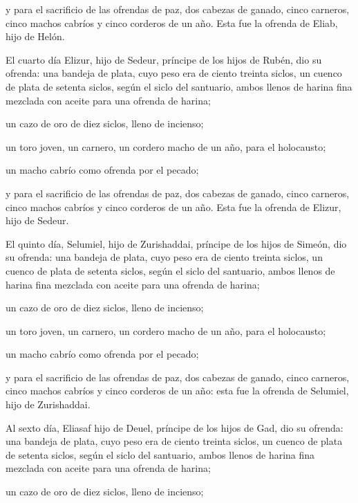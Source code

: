 \begin{paracol}{2}
 y para el sacrificio de las ofrendas de paz, dos cabezas
de ganado, cinco carneros, cinco machos cabríos y cinco corderos de un
año. Esta fue la ofrenda de Eliab, hijo de Helón.

 El cuarto día Elizur, hijo de Sedeur, príncipe de los
hijos de Rubén,  dio su ofrenda: una bandeja de plata,
cuyo peso era de ciento treinta siclos, un cuenco de plata de setenta
siclos, según el siclo del santuario, ambos llenos de harina fina
mezclada con aceite para una ofrenda de harina;

 un cazo de oro de diez siclos, lleno de incienso;

 un toro joven, un carnero, un cordero macho de un año,
para el holocausto;

 un macho cabrío como ofrenda por el pecado;

 y para el sacrificio de las ofrendas de paz, dos cabezas
de ganado, cinco carneros, cinco machos cabríos y cinco corderos de un
año. Esta fue la ofrenda de Elizur, hijo de Sedeur.

 El quinto día, Selumiel, hijo de Zurishaddai, príncipe
de los hijos de Simeón,  dio su ofrenda: una bandeja de
plata, cuyo peso era de ciento treinta siclos, un cuenco de plata de
setenta siclos, según el siclo del santuario, ambos llenos de harina
fina mezclada con aceite para una ofrenda de harina;

 un cazo de oro de diez siclos, lleno de incienso;

 un toro joven, un carnero, un cordero macho de un año,
para el holocausto;

 un macho cabrío como ofrenda por el pecado;

 y para el sacrificio de las ofrendas de paz, dos cabezas
de ganado, cinco carneros, cinco machos cabríos y cinco corderos de un
año: esta fue la ofrenda de Selumiel, hijo de Zurishaddai.

 Al sexto día, Eliasaf hijo de Deuel, príncipe de los
hijos de Gad,  dio su ofrenda: una bandeja de plata, cuyo
peso era de ciento treinta siclos, un cuenco de plata de setenta siclos,
según el siclo del santuario, ambos llenos de harina fina mezclada con
aceite para una ofrenda de harina;

 un cazo de oro de diez siclos, lleno de incienso;


\end{paracol}
